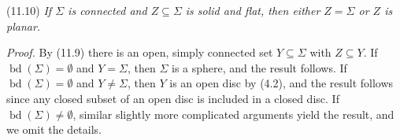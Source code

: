 \stmt
(11.10) \textit{If $\Sigma$ is connected and $Z \subseteq \Sigma$ is solid and flat, then either $Z = \Sigma$ or $Z$ is planar.}

\textit{Proof.} By (11.9) there is an open, simply connected set $Y \subseteq \Sigma$ with $Z \subseteq Y$. If $\operatorname{bd}(\Sigma) = \emptyset$ and $Y = \Sigma$, then $\Sigma$ is a sphere, and the result follows. If $\operatorname{bd}(\Sigma) = \emptyset$ and $Y \ne \Sigma$, then $Y$ is an open disc by (4.2), and the result follows since any closed subset of an open disc is included in a closed disc. If $\operatorname{bd}(\Sigma) \ne \emptyset$, similar slightly more complicated arguments yield the result, and we omit the details.
